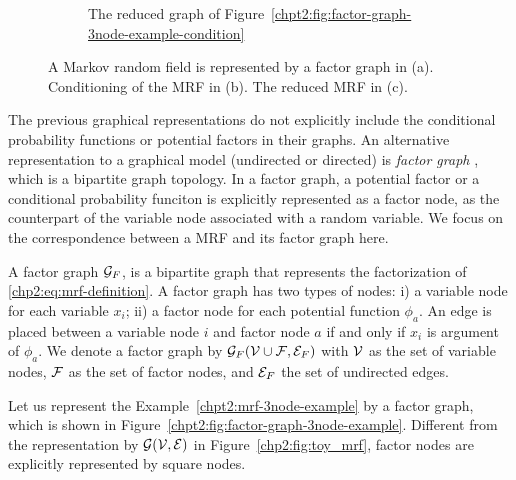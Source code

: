 \begin{figure}[!t]
\begin{subfigure}{.3\textwidth}
    \caption{The reduced graph of Figure~\ref{chpt2:fig:factor-graph-3node-example-condition}}
    \label{chpt2:fig:factor-graph-3node-example-reduced}
  \end{subfigure}
  
  \caption{A Markov random field is represented by a factor graph in (a). Conditioning of the MRF in (b). The reduced MRF in (c).}
  \label{chp2:tab:toy-factor-graph}
\end{figure}

The previous graphical representations do not explicitly include the conditional probability functions or potential factors in their graphs. An alternative representation to a graphical model (undirected or directed) is \textit{factor graph} \cite{kschischang2001factor_graph},
which is a bipartite graph topology. In a factor graph, a potential factor or a conditional probability funciton is explicitly represented as a factor node, as the counterpart of the variable node associated with a random variable. We focus on the correspondence between a MRF and its factor graph here.
\begin{definition}\label{chpt2:def:factor-graph}
  A factor graph $\mathcal{G}_F$, is a bipartite graph that represents the factorization of \eqref{chp2:eq:mrf-definition}. A factor graph has two types of nodes: i) a variable node for each variable $x_i$; ii) a factor node for each potential function $\phi_{a}$. An edge is placed between a variable node $i$ and factor node $a$ if and only if $x_i$ is argument of $\phi_{a}$. We denote a factor graph by $\mathcal{G}_F(\mathcal{V} \cup \mathcal{F}, \mathcal{E}_F)$ with $\mathcal{V}$ as the set of variable nodes, $\mathcal{F}$ as the set of factor nodes, and $\mathcal{E}_F$ the set of undirected edges.
\end{definition}
\begin{example}
  Let us represent the Example~\ref{chpt2:mrf-3node-example} by a factor graph, which is shown in Figure~\ref{chpt2:fig:factor-graph-3node-example}. Different from the representation by $\mathcal{G}(\mathcal{V}, \mathcal{E})$ in Figure~\ref{chp2:fig:toy_mrf}, factor nodes are explicitly represented by square nodes.
\end{example}


